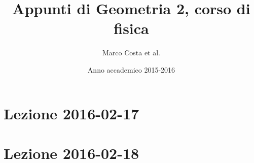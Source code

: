 \documentclass[a4paper]{article}
\title{Appunti di Geometria 2, corso di fisica}
\author{Marco Costa et al.}
\date{Anno accademico 2015-2016}
\theoremstyle{definition}
\theoremstyle{plain}
\theoremstyle{remark}
\newenvironment{lesson}[3]{%
\section{Lezione #1-#2-#3}}{%
}
\newcommand\includelesson[3]{%
\begin{lesson}{#1}{#2}{#3}

\end{lesson}}
\begin{document}
\maketitle

\tableofcontents

\includelesson{2016}{02}{17}
\includelesson{2016}{02}{18}
\end{document}
